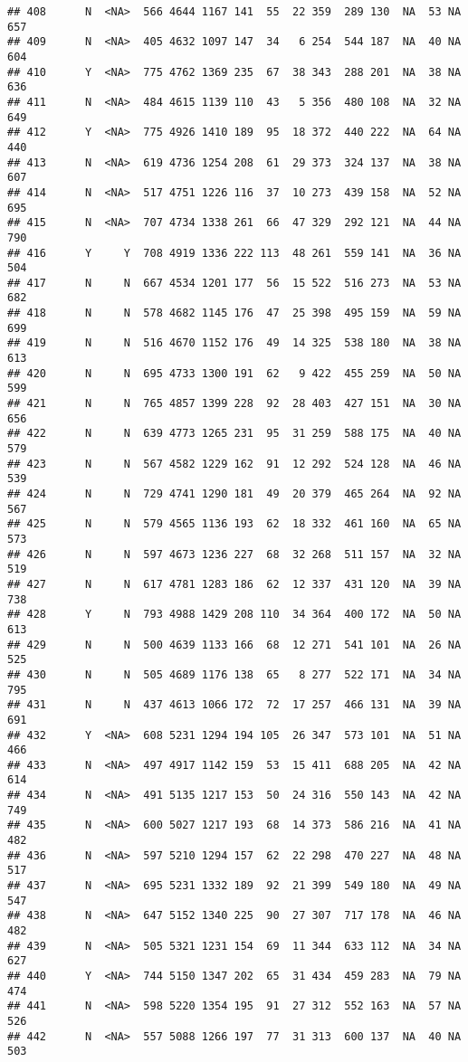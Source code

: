 \documentclass[]{article}
\begin{document}
\begin{verbatim}
## 408      N  <NA>  566 4644 1167 141  55  22 359  289 130  NA  53 NA  657
## 409      N  <NA>  405 4632 1097 147  34   6 254  544 187  NA  40 NA  604
## 410      Y  <NA>  775 4762 1369 235  67  38 343  288 201  NA  38 NA  636
## 411      N  <NA>  484 4615 1139 110  43   5 356  480 108  NA  32 NA  649
## 412      Y  <NA>  775 4926 1410 189  95  18 372  440 222  NA  64 NA  440
## 413      N  <NA>  619 4736 1254 208  61  29 373  324 137  NA  38 NA  607
## 414      N  <NA>  517 4751 1226 116  37  10 273  439 158  NA  52 NA  695
## 415      N  <NA>  707 4734 1338 261  66  47 329  292 121  NA  44 NA  790
## 416      Y     Y  708 4919 1336 222 113  48 261  559 141  NA  36 NA  504
## 417      N     N  667 4534 1201 177  56  15 522  516 273  NA  53 NA  682
## 418      N     N  578 4682 1145 176  47  25 398  495 159  NA  59 NA  699
## 419      N     N  516 4670 1152 176  49  14 325  538 180  NA  38 NA  613
## 420      N     N  695 4733 1300 191  62   9 422  455 259  NA  50 NA  599
## 421      N     N  765 4857 1399 228  92  28 403  427 151  NA  30 NA  656
## 422      N     N  639 4773 1265 231  95  31 259  588 175  NA  40 NA  579
## 423      N     N  567 4582 1229 162  91  12 292  524 128  NA  46 NA  539
## 424      N     N  729 4741 1290 181  49  20 379  465 264  NA  92 NA  567
## 425      N     N  579 4565 1136 193  62  18 332  461 160  NA  65 NA  573
## 426      N     N  597 4673 1236 227  68  32 268  511 157  NA  32 NA  519
## 427      N     N  617 4781 1283 186  62  12 337  431 120  NA  39 NA  738
## 428      Y     N  793 4988 1429 208 110  34 364  400 172  NA  50 NA  613
## 429      N     N  500 4639 1133 166  68  12 271  541 101  NA  26 NA  525
## 430      N     N  505 4689 1176 138  65   8 277  522 171  NA  34 NA  795
## 431      N     N  437 4613 1066 172  72  17 257  466 131  NA  39 NA  691
## 432      Y  <NA>  608 5231 1294 194 105  26 347  573 101  NA  51 NA  466
## 433      N  <NA>  497 4917 1142 159  53  15 411  688 205  NA  42 NA  614
## 434      N  <NA>  491 5135 1217 153  50  24 316  550 143  NA  42 NA  749
## 435      N  <NA>  600 5027 1217 193  68  14 373  586 216  NA  41 NA  482
## 436      N  <NA>  597 5210 1294 157  62  22 298  470 227  NA  48 NA  517
## 437      N  <NA>  695 5231 1332 189  92  21 399  549 180  NA  49 NA  547
## 438      N  <NA>  647 5152 1340 225  90  27 307  717 178  NA  46 NA  482
## 439      N  <NA>  505 5321 1231 154  69  11 344  633 112  NA  34 NA  627
## 440      Y  <NA>  744 5150 1347 202  65  31 434  459 283  NA  79 NA  474
## 441      N  <NA>  598 5220 1354 195  91  27 312  552 163  NA  57 NA  526
## 442      N  <NA>  557 5088 1266 197  77  31 313  600 137  NA  40 NA  503

\end{verbatim}
\end{document}
